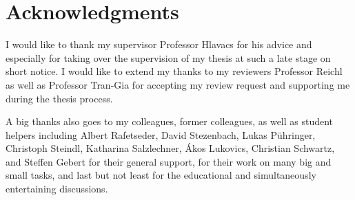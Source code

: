 \newpage %
\chapter*{Acknowledgments}

I would like to thank my supervisor Professor Hlavacs for his advice and especially for taking over the supervision of my thesis at such a late stage on short notice. I would like to extend my thanks to my reviewers Professor Reichl as well as Professor Tran-Gia for accepting my review request and supporting me during the thesis process.

A big thanks also goes to my colleagues, former colleagues, as well as student helpers including Albert Rafetseder, David Stezenbach, Lukas Pühringer, Christoph Steindl, Katharina Salzlechner, Ákos Lukovics, Christian Schwartz, and Steffen Gebert for their general support, for their work on many big and small tasks, and last but not least for the educational and simultaneously entertaining discussions. 
